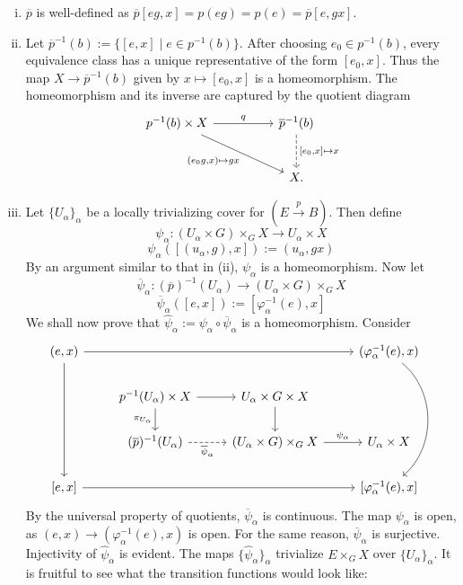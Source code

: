 \documentclass[11pt,a4paper]{article}
\begin{document}
\begin{enumerate}[(i)]
    \item $\overline{p}$ is well-defined as $\overline{p}[eg, x] = p(eg) = p(e) = \overline{p}[e,gx]$.
    \item Let $\overline{p}^{-1}(b):= \{[e,x] \mid e\in p^{-1}(b)\}$. After choosing $e_0\in p^{-1}(b)$, every equivalence class has a unique representative of the form $[e_0,x]$. Thus the map $X\to\overline{p}^{-1}(b)$ given by $x\mapsto[e_0,x]$ is a homeomorphism.
    The homeomorphism and its inverse are captured by the quotient diagram
    \[
    \begin{tikzcd}[column sep=huge,row sep=large]
        {p^{-1}(b)\times X} \arrow[r,"q"] \arrow[dr,"{(e_0g,x)\mapsto gx}"']
        & {\overline p^{-1}(b)} \arrow[d,dashed,"{[e_0,x]\mapsto x}"] \\
        & X.
    \end{tikzcd}
    \]
\item Let $\{U_{\alpha}\}_{\alpha}$ be a locally trivializing cover for $(E\xrightarrow{p} B)$. Then define
$$\psi_{\alpha}: (U_{\alpha}\times G)\times_G X \rightarrow U_{\alpha}\times X$$
$$\psi_{\alpha}([(u_{\alpha}, g), x]):= (u_{\alpha}, gx)$$
By an argument similar to that in (ii), $\psi_{\alpha}$ is a homeomorphism. Now let
$$\overline{\psi}_{\alpha}: (\overline{p})^{-1}(U_{\alpha}) \rightarrow (U_{\alpha}\times G)\times_G X$$
$$\overline{\psi}_{\alpha}([e, x]):= [\varphi_{\alpha}^{-1}(e), x]$$
We shall now prove that $\widehat{\psi}_{\alpha}:= \psi_{\alpha}\circ \overline{\psi}_{\alpha}$ is a homeomorphism. Consider
\[\begin{tikzcd}
	{(e, x)} &&& {(\varphi_{\alpha}^{-1}(e), x)} \\
	& {p^{-1}(U_{\alpha})\times X} & {U_{\alpha}\times G\times X} \\
	& {(\overline{p})^{-1}(U_{\alpha})} & {(U_{\alpha}\times G)\times_G X} & {U_{\alpha}\times X} \\
	{[e, x]} &&& {[\varphi_{\alpha}^{-1}(e), x]}
	\arrow[from=2-2, to=2-3]
	\arrow["{\pi_{U_{\alpha}}}"', from=2-2, to=3-2]
	\arrow["{\overline{\psi}_{\alpha}}"', dashed, from=3-2, to=3-3]
	\arrow[from=2-3, to=3-3]
	\arrow["{\psi_{\alpha}}", from=3-3, to=3-4]
	\arrow[from=1-1, to=1-4]
	\arrow[from=1-1, to=4-1]
	\arrow[from=4-1, to=4-4]
	\arrow[bend left = 50, from=1-4, to=4-4]
\end{tikzcd}\]
By the universal property of quotients, $\overline{\psi}_{\alpha}$ is continuous. The map $\psi_{\alpha}$ is open, as $(e, x) \rightarrow (\varphi_{\alpha}^{-1}(e), x)$ is open. For the same reason, $\overline{\psi}_{\alpha}$ is surjective. Injectivity of $\widehat{\psi}_{\alpha}$ is evident. The maps $\{\widehat{\psi}_{\alpha}\}_{\alpha}$ trivialize $E\times_G X$ over $\{U_{\alpha}\}_{\alpha}$. It is fruitful to see what the transition functions would look like:



\end{enumerate}
\end{document}
